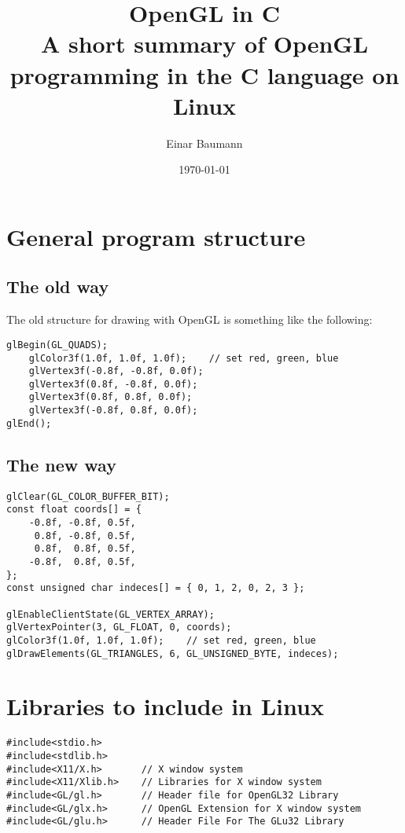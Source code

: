 \documentclass[a4paper, english, 12pt]{article}
\title{OpenGL in C\\ 
\vspace{6pt}\large A short summary of OpenGL programming in the C language on Linux \\ 
 }
\author{Einar Baumann}
\date{\today}
\begin{document}
\maketitle
\thispagestyle{empty}
\pagebreak

\section{General program structure}
\label{sec:general_structure}

\subsection{The old way}
\label{sub:old_way}
The old structure for drawing with OpenGL is something like the following:

\begin{lstlisting}
glBegin(GL_QUADS);	
	glColor3f(1.0f, 1.0f, 1.0f);	// set red, green, blue
	glVertex3f(-0.8f, -0.8f, 0.0f);
	glVertex3f(0.8f, -0.8f, 0.0f);
	glVertex3f(0.8f, 0.8f, 0.0f);
	glVertex3f(-0.8f, 0.8f, 0.0f);
glEnd();
\end{lstlisting}


\subsection{The new way}
\label{sub:new_way}

\begin{lstlisting}
glClear(GL_COLOR_BUFFER_BIT);
const float coords[] = {
	-0.8f, -0.8f, 0.5f,	  
	 0.8f, -0.8f, 0.5f,   
	 0.8f,  0.8f, 0.5f,    
	-0.8f,  0.8f, 0.5f,  
};
const unsigned char indeces[] = { 0, 1, 2, 0, 2, 3 };

glEnableClientState(GL_VERTEX_ARRAY);
glVertexPointer(3, GL_FLOAT, 0, coords);
glColor3f(1.0f, 1.0f, 1.0f);	// set red, green, blue
glDrawElements(GL_TRIANGLES, 6, GL_UNSIGNED_BYTE, indeces);
\end{lstlisting}




\section{Libraries to include in Linux}
\label{sec:linux_libs}

\begin{lstlisting}
#include<stdio.h>
#include<stdlib.h>
#include<X11/X.h>		// X window system
#include<X11/Xlib.h>	// Libraries for X window system
#include<GL/gl.h>		// Header file for OpenGL32 Library
#include<GL/glx.h>		// OpenGL Extension for X window system
#include<GL/glu.h>		// Header File For The GLu32 Library
\end{lstlisting}
\end{document}
